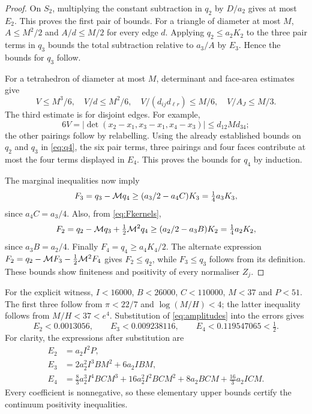 \begin{proof}
On $S_2$, multiplying the constant subtraction in $q_2$ by $D/a_2$ gives at most $E_2$. This proves the first pair of bounds. For a triangle of diameter at most $M$, $A\leq M^2/2$ and $A/d\leq M/2$ for every edge $d$. Applying $q_2\leq a_2K_2$ to the three pair terms in $q_3$ bounds the total subtraction relative to $a_3/A$ by $E_3$. Hence the bounds for $q_3$ follow.

For a tetrahedron of diameter at most $M$, determinant and face-area estimates give
\[
 V\leq M^3/6,\quad V/d\leq M^2/6,\quad
 V/(d_{ij}d_{\ell r})\leq M/6,\quad V/A_J\leq M/3.
\]
The third estimate is for disjoint edges. For example,
\[
 6V=|\det(x_2-x_1,x_3-x_1,x_4-x_3)|\leq d_{12}M d_{34};
\]
the other pairings follow by relabelling. Using the already established bounds on $q_2$ and $q_3$ in \eqref{eq:q4}, the six pair terms, three pairings and four faces contribute at most the four terms displayed in $E_4$. This proves the bounds for $q_4$ by induction.

The marginal inequalities now imply
\[
 F_3=q_3-\mathcal M q_4\geq(a_3/2-a_4C)K_3=\tfrac14a_3K_3,
\]
since $a_4C=a_3/4$. Also, from \eqref{eq:Fkernels},
\[
 F_2=q_2-\mathcal M q_3+\tfrac12\mathcal M^2q_4
 \geq (a_2/2-a_3B)K_2=\tfrac14a_2K_2,
\]
since $a_3B=a_2/4$. Finally $F_4=q_4\geq a_4K_4/2$. The alternate expression $F_2=q_2-\mathcal M F_3-\frac12\mathcal M^2F_4$ gives $F_2\leq q_2$, while $F_3\leq q_3$ follows from its definition. These bounds show finiteness and positivity of every normaliser $Z_j$.
\end{proof}

For the explicit witness, $I<16000$, $B<26000$, $C<110000$, $M<37$ and $P<51$. The first three follow from $\pi<22/7$ and $\log(M/H)<4$; the latter inequality follows from $M/H<37<e^4$. Substitution of \eqref{eq:amplitudes} into the errors gives
\[
 E_2<0.0013056,\qquad E_3<0.009238116,\qquad E_4<0.119547065<\tfrac12.
\]
For clarity, the expressions after substitution are
\begin{align*}
 E_2&=a_2 I^2P,\\
 E_3&=2a_2^2I^3BM^2+6a_2IB M,\\
 E_4&=\tfrac83a_2^3I^4BCM^3+16a_2^2I^2BCM^2
       +8a_2BCM+\tfrac{16}{3}a_2ICM.
\end{align*}
Every coefficient is nonnegative, so these elementary upper bounds certify the continuum positivity inequalities.
